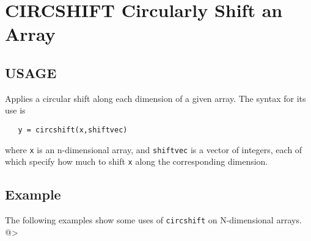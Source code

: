 \section{CIRCSHIFT Circularly Shift an Array}

\subsection{USAGE}

Applies a circular shift along each dimension of a given array.  The
syntax for its use is
\begin{verbatim}
   y = circshift(x,shiftvec)
\end{verbatim}
where \verb|x| is an n-dimensional array, and \verb|shiftvec| is a vector of
integers, each of which specify how much to shift \verb|x| along the
corresponding dimension.  
\subsection{Example}

The following examples show some uses of \verb|circshift| on N-dimensional
arrays.
@>
